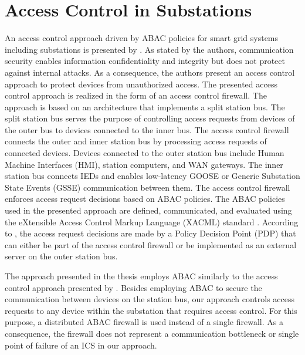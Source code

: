 \section{Access Control in Substations}
An access control approach driven by ABAC policies for smart grid systems including substations is presented by \citeauthor{Ruland2018} \cite{Ruland2018}.
As stated by the authors, communication security enables information confidentiality and integrity but does not protect against internal attacks.
As a consequence, the authors present an access control approach to protect devices from unauthorized access.
The presented access control approach is realized in the form of an access control firewall.
The approach is based on an architecture that implements a split station bus.
The split station bus serves the purpose of controlling access requests from devices of the outer bus to devices connected to the inner bus.
The access control firewall connects the outer and inner station bus by processing access requests of connected devices.
Devices connected to the outer station bus include Human Machine Interfaces (HMI), station computers, and WAN gateways.
The inner station bus connects IEDs and enables low-latency GOOSE or Generic Substation State Events (GSSE) communication between them.
The access control firewall enforces access request decisions based on ABAC policies.
The ABAC policies used in the presented approach are defined, communicated, and evaluated using the eXtensible Access Control Markup Language (XACML) standard \cite{Oasis2013}.
According to \citeauthor{Ruland2018}, the access request decisions are made by a Policy Decision Point (PDP) that can either be part of the access control firewall or be implemented as an external server on the outer station bus.

The approach presented in the thesis employs ABAC similarly to the access control approach presented by \citeauthor{Ruland2018}.
Besides employing ABAC to secure the communication between devices on the station bus, our approach controls access requests to any device within the substation that requires access control. 
For this purpose, a distributed ABAC firewall is used instead of a single firewall.
As a consequence, the firewall does not represent a communication bottleneck or single point of failure of an ICS in our approach.

